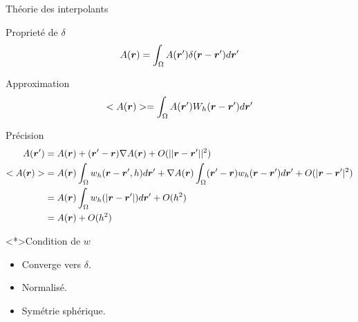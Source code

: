 \begin{frame}[<+->][shrink]{Théorie des interpolants}
\begin{block}{Proprieté de $\delta$}
  \begin{equation*}
 A({\boldsymbol {r}})=\int_{\Omega} A({\boldsymbol {r}}')\delta({\boldsymbol {r}}-{\boldsymbol {r}}')d{\boldsymbol {r}}'
 \end{equation*}
\end{block}

\begin{block}{Approximation}
\begin{equation*}
 <A({\boldsymbol {r}})>=\int_{\Omega} A({\boldsymbol {r}}')W_h({\boldsymbol {r}}-{\boldsymbol {r}}')d{\boldsymbol {r}}'
 \end{equation*}
\end{block}

\begin{block}{Précision}
 \begin{align*}
  A({\boldsymbol {r}}')&=A({\boldsymbol {r}})+({\boldsymbol {r}}'-{\boldsymbol {r}})\nabla A({\boldsymbol {r}})+O(||{\boldsymbol {r}}-{\boldsymbol {r}}'||^2)\\
  <A({\boldsymbol {r}})>&=A({\boldsymbol {r}})\int_{\Omega}w_{h}({\boldsymbol {r}}-{\boldsymbol {r}}',h)d{\boldsymbol {r}}'+\nabla A({\boldsymbol {r}})\int_{\Omega}({\boldsymbol {r}}'-{\boldsymbol {r}})w_{h}({\boldsymbol {r}}-{\boldsymbol {r}}')d{\boldsymbol {r}}'+O(|{\boldsymbol {r}}-{\boldsymbol {r}}'|^2)\\
  &=A({\boldsymbol {r}})\int_{\Omega} w_{h}(|{\boldsymbol {r}}-{\boldsymbol {r}}'|)d{\boldsymbol {r}}'+O(h^2)\\
  &=A({\boldsymbol {r}})+O(h^2)\\
 \end{align*}
\end{block}

\begin{block}<*>{Condition de $w$}
\begin{itemize}
 \item Converge vers $\delta$.
 \item Normalisé.
 \item Symétrie sphérique.
\end{itemize}
\end{block}

 
\end{frame}
